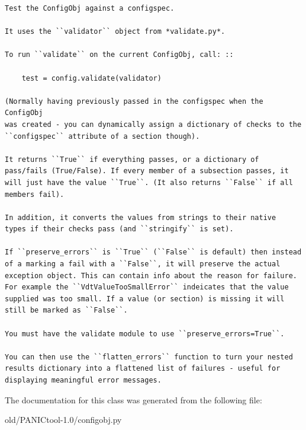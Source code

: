 \footnotesize\begin{verbatim}
Test the ConfigObj against a configspec.

It uses the ``validator`` object from *validate.py*.

To run ``validate`` on the current ConfigObj, call: ::

    test = config.validate(validator)

(Normally having previously passed in the configspec when the ConfigObj
was created - you can dynamically assign a dictionary of checks to the
``configspec`` attribute of a section though).

It returns ``True`` if everything passes, or a dictionary of
pass/fails (True/False). If every member of a subsection passes, it
will just have the value ``True``. (It also returns ``False`` if all
members fail).

In addition, it converts the values from strings to their native
types if their checks pass (and ``stringify`` is set).

If ``preserve_errors`` is ``True`` (``False`` is default) then instead
of a marking a fail with a ``False``, it will preserve the actual
exception object. This can contain info about the reason for failure.
For example the ``VdtValueTooSmallError`` indeicates that the value
supplied was too small. If a value (or section) is missing it will
still be marked as ``False``.

You must have the validate module to use ``preserve_errors=True``.

You can then use the ``flatten_errors`` function to turn your nested
results dictionary into a flattened list of failures - useful for
displaying meaningful error messages.
\end{verbatim}
\normalsize
 

The documentation for this class was generated from the following file:\begin{CompactItemize}
\item 
old/PANICtool-1.0/configobj.py\end{CompactItemize}
